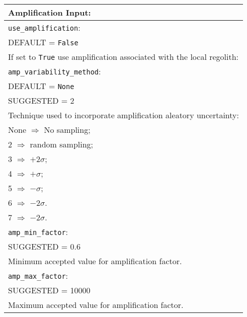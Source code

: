 \documentclass[a4paper, 12pt]{report}
\begin{document}
\vspace{2em}
\begin{tabular}{|p{\textwidth}|}
\hline
\vspace{0.3em} \noindent \Large \textbf{Amplification Input:} \normalsize \\
\hline \vspace{0.1em} \texttt{use\_amplification}: \\
DEFAULT = \texttt{False} \\
If set to \texttt{True} use amplification associated with the local regolith: \\
\hline \vspace{0.1em} \texttt{amp\_variability\_method}: \\
DEFAULT = \texttt{None} \\
SUGGESTED = 2 \\
Technique used to incorporate amplification aleatory uncertainty: \\
 \hspace{0.5em} None $\Rightarrow$ No sampling; \\
 \hspace{0.5em} 2 $\Rightarrow$ random sampling; \\
 \hspace{0.5em} 3 $\Rightarrow$ $+2\sigma$; \\
 \hspace{0.5em} 4 $\Rightarrow$ $+\sigma$; \\
 \hspace{0.5em} 5 $\Rightarrow$ $-\sigma$; \\
 \hspace{0.5em} 6 $\Rightarrow$ $-2\sigma$.\\
 \hspace{0.5em} 7 $\Rightarrow$ $-2\sigma$.\\
\hline \vspace{0.1em} \texttt{amp\_min\_factor}: \\
SUGGESTED = 0.6 \\
Minimum accepted value for amplification factor.    \\
\hline \vspace{0.1em} \texttt{amp\_max\_factor}: \\
SUGGESTED = 10000 \\
Maximum accepted value for amplification factor.   \\
\hline
\end{tabular}
\end{document}
